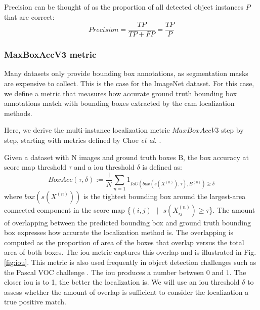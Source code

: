 Precision can be thought of as the proportion of all detected object instances $P$ that are correct:
\begin{equation} \label{eq:precision}
Precision = \frac{TP}{TP + FP} = \frac{TP}{P}
\end{equation}

\subsubsection{MaxBoxAccV3 metric} \label{sec:method_maxboxaccv3}
Many datasets only provide bounding box annotations, as segmentation masks are expensive to collect. This is the case for the ImageNet dataset. For this case, we define a metric that measures how accurate ground truth bounding box annotations match with bounding boxes extracted by the \acrshort{cam} localization methods.

Here, we derive the multi-instance localization metric $MaxBoxAccV3$ step by step, starting with metrics defined by Choe \textit{et al.} \cite{choe2020evaluating}.

Given a dataset with N images and ground truth boxes B, the box accuracy at score map threshold $\tau$ and a \acrshort{iou} threshold $\delta$ is defined as:
\begin{equation} \label{eq:boxacc}
    BoxAcc(\tau,\delta) := \frac{1}{N} \sum_{n=1}1_{IoU(box(s(X^{(n)}),\tau),B^{(n)})\ge\delta}
\end{equation}
where $box(s(X^{(n)}))$ is the tightest bounding box around the largest-area connected component in the score map \{$(i,j)\text{ }|\text{ }s(X^{(n)}_{ij}) \ge \tau$\}. The amount of overlapping between the predicted bounding box and ground truth bounding box expresses how accurate the localization method is. The overlapping is computed as the proportion of area of the boxes that overlap versus the total area of both boxes. The \acrfull{iou} metric captures this overlap and is illustrated in Fig. \ref{fig:iou}. This metric is also used frequently in object detection challenges such as the Pascal VOC challenge \cite{everingham2009pascal}. The \acrshort{iou} produces a number between $0$ and $1$. The closer \acrshort{iou} is to 1, the better the localization is. We will use an \acrshort{iou} threshold $\delta$ to assess whether the amount of overlap is sufficient to consider the localization a true positive match.

